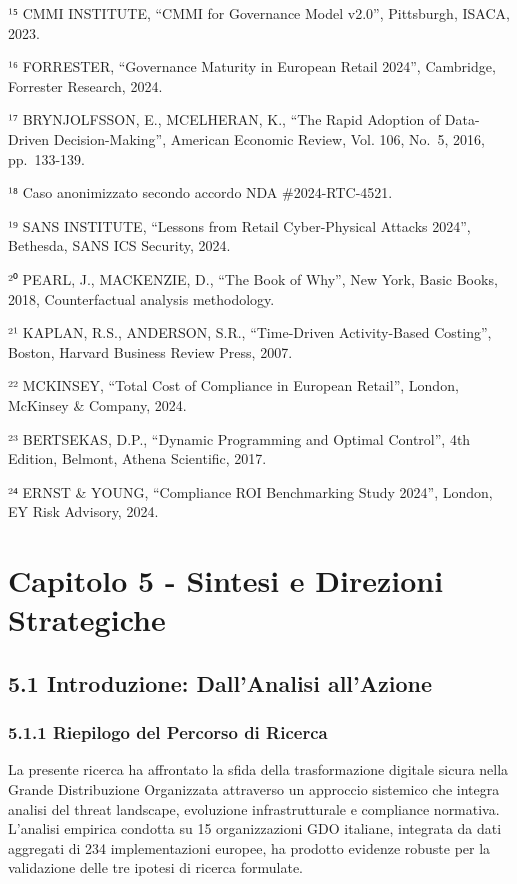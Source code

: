 \documentclass{report}
\begin{document}
¹⁵ CMMI INSTITUTE, ``CMMI for Governance Model v2.0'', Pittsburgh,
ISACA, 2023.

¹⁶ FORRESTER, ``Governance Maturity in European Retail 2024'',
Cambridge, Forrester Research, 2024.

¹⁷ BRYNJOLFSSON, E., MCELHERAN, K., ``The Rapid Adoption of Data-Driven
Decision-Making'', American Economic Review, Vol. 106, No.~5, 2016,
pp.~133-139.

¹⁸ Caso anonimizzato secondo accordo NDA \#2024-RTC-4521.

¹⁹ SANS INSTITUTE, ``Lessons from Retail Cyber-Physical Attacks 2024'',
Bethesda, SANS ICS Security, 2024.

²⁰ PEARL, J., MACKENZIE, D., ``The Book of Why'', New York, Basic Books,
2018, Counterfactual analysis methodology.

²¹ KAPLAN, R.S., ANDERSON, S.R., ``Time-Driven Activity-Based Costing'',
Boston, Harvard Business Review Press, 2007.

²² MCKINSEY, ``Total Cost of Compliance in European Retail'', London,
McKinsey \& Company, 2024.

²³ BERTSEKAS, D.P., ``Dynamic Programming and Optimal Control'', 4th
Edition, Belmont, Athena Scientific, 2017.

²⁴ ERNST \& YOUNG, ``Compliance ROI Benchmarking Study 2024'', London,
EY Risk Advisory, 2024.

\section{Capitolo 5 - Sintesi e Direzioni
Strategiche}\label{capitolo-5---sintesi-e-direzioni-strategiche}

\subsection{5.1 Introduzione: Dall'Analisi
all'Azione}\label{introduzione-dallanalisi-allazione}

\subsubsection{5.1.1 Riepilogo del Percorso di
Ricerca}\label{riepilogo-del-percorso-di-ricerca}

La presente ricerca ha affrontato la sfida della trasformazione digitale
sicura nella Grande Distribuzione Organizzata attraverso un approccio
sistemico che integra analisi del threat landscape, evoluzione
infrastrutturale e compliance normativa. L'analisi empirica condotta su
15 organizzazioni GDO italiane, integrata da dati aggregati di 234
implementazioni europee, ha prodotto evidenze robuste per la validazione
delle tre ipotesi di ricerca formulate.
\end{document}
